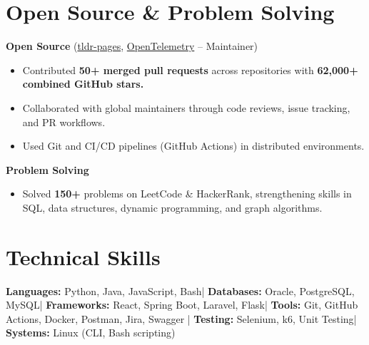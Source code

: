 \documentclass[a4paper,11pt]{article}
\newcommand{\subheading}[1]{\textbf{#1}}
\begin{document}
\begin{itemize}[leftmargin=0.15in, label={}, itemsep=6pt]
\end{itemize}




\section{Open Source \& Problem Solving}

\subheading{Open Source}
(\href{https://github.com/tldr-pages/tldr}{tldr-pages}, \href{https://github.com/open-telemetry}{OpenTelemetry} -- Maintainer)
\begin{itemize}[noitemsep, topsep=0pt]
    \item Contributed \textbf{50+ merged pull requests} across repositories with \textbf{62,000+ combined GitHub stars.}
    \item Collaborated with global maintainers through code reviews, issue tracking, and PR workflows.
    \item Used Git and CI/CD pipelines (GitHub Actions) in distributed environments.
\end{itemize}

\vspace{0.5em}

\subheading{Problem Solving}
\begin{itemize}[noitemsep, topsep=0pt]
    \item Solved \textbf{150+} problems on LeetCode \& HackerRank, strengthening skills in SQL, data structures, dynamic programming, and graph algorithms.
\end{itemize}




\section{Technical Skills}
\begin{itemize}[leftmargin=0.15in, label={}]
\small{\item{
\textbf{Languages:} Python, Java, JavaScript, Bash\;|\;
\textbf{Databases:} Oracle, PostgreSQL, MySQL\;|\;
\textbf{Frameworks:} React, Spring Boot, Laravel, Flask\;|\;
\textbf{Tools:} Git, GitHub Actions, Docker, Postman, Jira, Swagger \;|\;
\textbf{Testing:} Selenium, k6, Unit Testing\;|\;
\textbf{Systems:} Linux (CLI, Bash scripting)
}}
\end{itemize}




\end{document}

